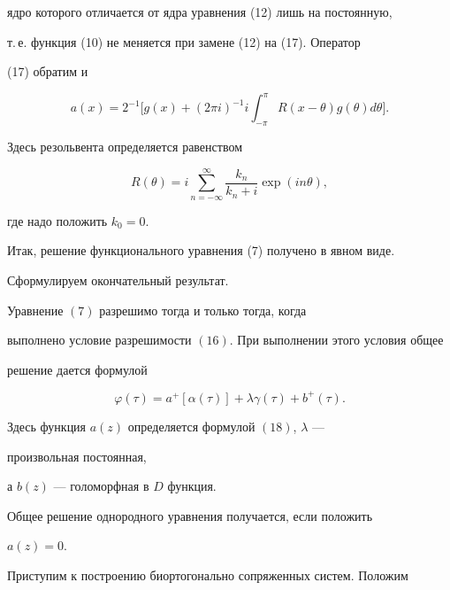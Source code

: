 ядро которого отличается от ядра уравнения (12) лишь на постоянную, 


т.\,е. функция (10) не меняется при замене (12) на (17). Оператор 


(17) обратим и 


\begin{equation} 


a(x)=2^{-1}\bigg[g(x)+(2\pi i)^{-1}i\int^\pi_{-\pi} 


R(x-\theta)g(\theta)d\theta\bigg]. 


\end{equation} 


Здесь резольвента определяется равенством 


$$ 


R(\theta)=i\sum^\infty_{n=-\infty}\frac{k_n}{k_n+i} 


\exp(in\theta), 


$$ 


где надо положить $k_0=0$. 


 


Итак, решение функционального уравнения (7) получено в явном виде.  


Сформулируем окончательный результат. 


 


\begin{thm} 


Уравнение $(7)$ разрешимо тогда и только тогда, когда  


выполнено условие разрешимости $(16)$. При выполнении этого условия общее  


решение дается формулой 


$$ 


\varphi(\tau)=a^+[\alpha(\tau)]+\lambda\gamma(\tau)+b^+(\tau). 


$$ 


Здесь функция $a(z)$ определяется формулой $(18)$, $\lambda$ --- 


произвольная постоянная,  


а $b(z)$ --- голоморфная в $D$ функция. 


Общее решение однородного уравнения получается, если положить  


$a(z)=0$. 


\end{thm} 


 


Приступим к построению биортогонально сопряженных систем. Положим 


